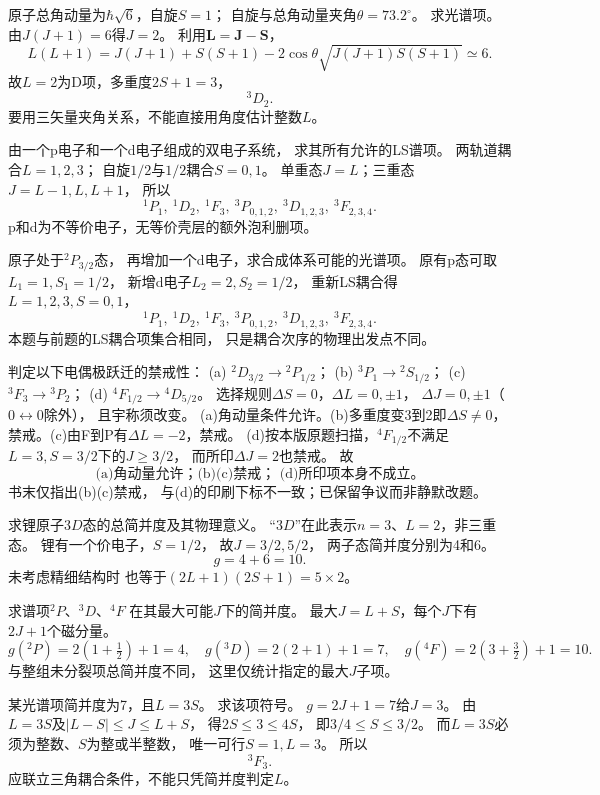 原子总角动量为$\hbar\sqrt6$，自旋$S=1$；
自旋与总角动量夹角$\theta=73.2^\circ$。
求光谱项。
\exsolution
由$J(J+1)=6$得$J=2$。
利用$\boldsymbol L=\boldsymbol J-\boldsymbol S$，
\[
 L(L+1)=J(J+1)+S(S+1)
 -2\cos\theta\sqrt{J(J+1)S(S+1)}\simeq6.
\]
故$L=2$为D项，多重度$2S+1=3$，
\[
 \boxed{{}^{3}D_2}.
\]
\excheck 要用三矢量夹角关系，不能直接用角度估计整数$L$。

由一个p电子和一个d电子组成的双电子系统，
求其所有允许的LS谱项。
\exsolution
两轨道耦合$L=1,2,3$；
自旋$1/2$与$1/2$耦合$S=0,1$。
单重态$J=L$；三重态$J=L-1,L,L+1$，
所以
\[
 \boxed{{}^{1}P_1,\ {}^{1}D_2,\ {}^{1}F_3,\
 {}^{3}P_{0,1,2},\ {}^{3}D_{1,2,3},\ {}^{3}F_{2,3,4}}.
\]
\excheck p和d为不等价电子，无等价壳层的额外泡利删项。

原子处于\({}^{2}P_{3/2}\)态，
再增加一个d电子，求合成体系可能的光谱项。
\exsolution
原有p态可取$L_1=1,S_1=1/2$，
新增d电子$L_2=2,S_2=1/2$，
重新LS耦合得$L=1,2,3,S=0,1$，
\[
 \boxed{{}^{1}P_1,\ {}^{1}D_2,\ {}^{1}F_3,\
 {}^{3}P_{0,1,2},\ {}^{3}D_{1,2,3},\ {}^{3}F_{2,3,4}}.
\]
\excheck 本题与前题的LS耦合项集合相同，
只是耦合次序的物理出发点不同。

判定以下电偶极跃迁的禁戒性：
(a) \({}^{2}D_{3/2}\to{}^{2}P_{1/2}\)；
(b) \({}^{3}P_1\to{}^{2}S_{1/2}\)；
(c) \({}^{3}F_3\to{}^{3}P_2\)；
(d) \({}^{4}F_{1/2}\to{}^{4}D_{5/2}\)。
\exsolution
选择规则$\Delta S=0$，$\Delta L=0,\pm1$，
$\Delta J=0,\pm1$（$0\leftrightarrow0$除外），
且宇称须改变。
(a)角动量条件允许。(b)多重度变3到2即$\Delta S\ne0$，
禁戒。(c)由F到P有$\Delta L=-2$，禁戒。
(d)按本版原题扫描，\({}^{4}F_{1/2}\)不满足
$L=3,S=3/2$下的$J\ge3/2$，
而所印$\Delta J=2$也禁戒。
故
\[
 \boxed{\text{(a)角动量允许；(b)(c)禁戒；
 (d)所印项本身不成立。}}
\]
\excheck 书末仅指出(b)(c)禁戒，
与(d)的印刷下标不一致；已保留争议而非静默改题。

求锂原子$3D$态的总简并度及其物理意义。
\exsolution
“$3D$”在此表示$n=3$、$L=2$，非三重态。
锂有一个价电子，$S=1/2$，
故$J=3/2,5/2$，
两子态简并度分别为4和6。
\[
 \boxed{g=4+6=10}.
\]
\excheck 未考虑精细结构时
也等于$(2L+1)(2S+1)=5\times2$。

求谱项\({}^{2}P\)、\({}^{3}D\)、\({}^{4}F\)
在其最大可能$J$下的简并度。
\exsolution
最大$J=L+S$，每个$J$下有$2J+1$个磁分量。
\[
 \boxed{g({}^{2}P)=2(1+\tfrac12)+1=4},\quad
 \boxed{g({}^{3}D)=2(2+1)+1=7},\quad
 \boxed{g({}^{4}F)=2(3+\tfrac32)+1=10}.
\]
\excheck 与整组未分裂项总简并度不同，
这里仅统计指定的最大$J$子项。

某光谱项简并度为7，且$L=3S$。
求该项符号。
\exsolution
$g=2J+1=7$给$J=3$。
由$L=3S$及$|L-S|\le J\le L+S$，
得$2S\le3\le4S$，
即$3/4\le S\le3/2$。
而$L=3S$必须为整数、$S$为整或半整数，
唯一可行$S=1,L=3$。
所以
\[
 \boxed{{}^{3}F_3}.
\]
\excheck 应联立三角耦合条件，不能只凭简并度判定$L$。
